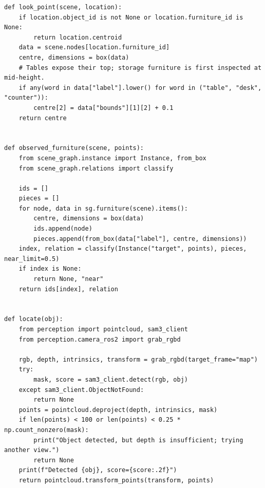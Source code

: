 \documentclass[11pt,a4paper]{book}
\begin{document}
\begin{lstlisting}
def look_point(scene, location):
    if location.object_id is not None or location.furniture_id is None:
        return location.centroid
    data = scene.nodes[location.furniture_id]
    centre, dimensions = box(data)
    # Tables expose their top; storage furniture is first inspected at mid-height.
    if any(word in data["label"].lower() for word in ("table", "desk", "counter")):
        centre[2] = data["bounds"][1][2] + 0.1
    return centre


def observed_furniture(scene, points):
    from scene_graph.instance import Instance, from_box
    from scene_graph.relations import classify

    ids = []
    pieces = []
    for node, data in sg.furniture(scene).items():
        centre, dimensions = box(data)
        ids.append(node)
        pieces.append(from_box(data["label"], centre, dimensions))
    index, relation = classify(Instance("target", points), pieces, near_limit=0.5)
    if index is None:
        return None, "near"
    return ids[index], relation


def locate(obj):
    from perception import pointcloud, sam3_client
    from perception.camera_ros2 import grab_rgbd

    rgb, depth, intrinsics, transform = grab_rgbd(target_frame="map")
    try:
        mask, score = sam3_client.detect(rgb, obj)
    except sam3_client.ObjectNotFound:
        return None
    points = pointcloud.deproject(depth, intrinsics, mask)
    if len(points) < 100 or len(points) < 0.25 * np.count_nonzero(mask):
        print("Object detected, but depth is insufficient; trying another view.")
        return None
    print(f"Detected {obj}, score={score:.2f}")
    return pointcloud.transform_points(transform, points)



\end{lstlisting}
\end{document}
